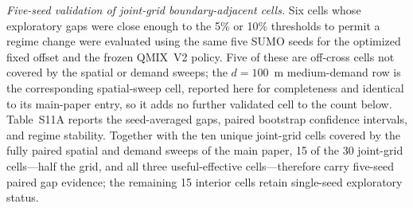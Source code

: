 \documentclass[12pt]{article}
\begin{document}
\begin{table}[H]
\centering
\caption{Three-intersection multi-objective offset patterns from the $19\times19$ sweep.}
\label{tab:supp_multiobj}
\small
{}
\end{table}
\textit{Five-seed validation of joint-grid boundary-adjacent cells.}
Six cells whose exploratory gaps were close enough to the 5\% or 10\%
thresholds to permit a regime change were evaluated using the same five
SUMO seeds for the optimized fixed offset and the frozen QMIX~V2 policy.
Five of these are off-cross cells not covered by the spatial or demand
sweeps; the $d=100$~m medium-demand row is the corresponding
spatial-sweep cell, reported here for completeness and identical to its
main-paper entry, so it adds no further validated cell to the count below.
Table~S11A reports the seed-averaged gaps, paired bootstrap confidence
intervals, and regime stability. Together with the ten unique joint-grid cells covered by the fully paired spatial and
demand sweeps of the main paper, 15 of the 30 joint-grid cells---half the
grid, and all three useful-effective cells---therefore carry five-seed paired
gap evidence; the remaining 15 interior cells retain single-seed exploratory
status.
\end{document}
